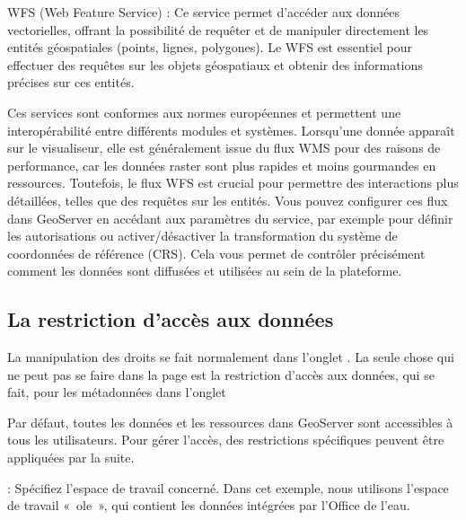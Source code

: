 \documentclass[letterpaper,10pt,french]{sphinxmanual}
\let\sphinxpxdimen\pdfpxdimen\else\newdimen\sphinxpxdimen
\begin{document}
\sphinxAtStartPar
WFS (Web Feature Service) : Ce service permet d’accéder aux données vectorielles, offrant la possibilité de requêter et de manipuler directement
les entités géospatiales (points, lignes, polygones). Le WFS est essentiel pour effectuer des requêtes sur les objets géospatiaux et obtenir des informations
précises sur ces entités.

\sphinxAtStartPar
Ces services sont conformes aux normes européennes et permettent une interopérabilité entre différents modules et systèmes. Lorsqu’une
donnée apparaît sur le visualiseur, elle est généralement issue du flux WMS pour des raisons de performance, car les données raster sont plus
rapides et moins gourmandes en ressources. Toutefois, le flux WFS est crucial pour permettre des interactions plus détaillées, telles que des requêtes sur les entités.
Vous pouvez configurer ces flux dans GeoServer en accédant aux paramètres du service, par exemple pour définir les autorisations ou activer/désactiver la
transformation du système de coordonnées de référence (CRS). Cela vous permet de contrôler précisément comment les données sont diffusées et utilisées au sein de la plateforme.


\subsection{La restriction d’accès aux données}
\label{\detokenize{doc_admin/services:la-restriction-d-acces-aux-donnees}}
\sphinxAtStartPar
La manipulation des droits se fait normalement dans l’onglet {\hyperref[\detokenize{doc_admin/utilisateurs:utilisateur}]{}}. La seule chose qui ne peut pas se faire dans la page {\hyperref[\detokenize{doc_admin/utilisateurs:utilisateur}]{}}
est la restriction d’accès aux données, qui se fait, pour les métadonnées dans l’onglet {\hyperref[\detokenize{doc_admin/catalogue:privileges}]{}}

\sphinxAtStartPar
Par défaut, toutes les données et les ressources dans GeoServer sont accessibles à tous les utilisateurs.
Pour gérer l’accès, des restrictions spécifiques peuvent être appliquées par la suite.

\noindent{\hspace*{\fill}\sphinxincludegraphics[width=700\sphinxpxdimen]{{geos_secu}.png}\hspace*{\fill}}

\sphinxAtStartPar
{} : Spécifiez l’espace de travail concerné. Dans cet exemple, nous utilisons l’espace de travail « ole »,
qui contient les données intégrées par l’Office de l’eau.
\end{document}
